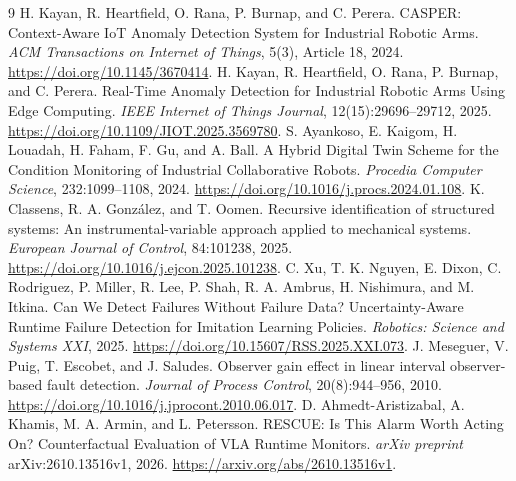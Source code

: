 \documentclass[11pt]{article}
\begin{document}
\begingroup{}
\begin{thebibliography}{9}
 H. Kayan, R. Heartfield, O. Rana, P. Burnap, and C. Perera. CASPER: Context-Aware IoT Anomaly Detection System for Industrial Robotic Arms. \emph{ACM Transactions on Internet of Things}, 5(3), Article 18, 2024. \url{https://doi.org/10.1145/3670414}.
 H. Kayan, R. Heartfield, O. Rana, P. Burnap, and C. Perera. Real-Time Anomaly Detection for Industrial Robotic Arms Using Edge Computing. \emph{IEEE Internet of Things Journal}, 12(15):29696--29712, 2025. \url{https://doi.org/10.1109/JIOT.2025.3569780}.
 S. Ayankoso, E. Kaigom, H. Louadah, H. Faham, F. Gu, and A. Ball. A Hybrid Digital Twin Scheme for the Condition Monitoring of Industrial Collaborative Robots. \emph{Procedia Computer Science}, 232:1099--1108, 2024. \url{https://doi.org/10.1016/j.procs.2024.01.108}.
 K. Classens, R. A. Gonz\'alez, and T. Oomen. Recursive identification of structured systems: An instrumental-variable approach applied to mechanical systems. \emph{European Journal of Control}, 84:101238, 2025. \url{https://doi.org/10.1016/j.ejcon.2025.101238}.
 C. Xu, T. K. Nguyen, E. Dixon, C. Rodriguez, P. Miller, R. Lee, P. Shah, R. A. Ambrus, H. Nishimura, and M. Itkina. Can We Detect Failures Without Failure Data? Uncertainty-Aware Runtime Failure Detection for Imitation Learning Policies. \emph{Robotics: Science and Systems XXI}, 2025. \url{https://doi.org/10.15607/RSS.2025.XXI.073}.
 J. Meseguer, V. Puig, T. Escobet, and J. Saludes. Observer gain effect in linear interval observer-based fault detection. \emph{Journal of Process Control}, 20(8):944--956, 2010. \url{https://doi.org/10.1016/j.jprocont.2010.06.017}.
 D. Ahmedt-Aristizabal, A. Khamis, M. A. Armin, and L. Petersson. RESCUE: Is This Alarm Worth Acting On? Counterfactual Evaluation of VLA Runtime Monitors. \emph{arXiv preprint} arXiv:2610.13516v1, 2026. \url{https://arxiv.org/abs/2610.13516v1}.
\end{thebibliography}
\endgroup
\end{document}
